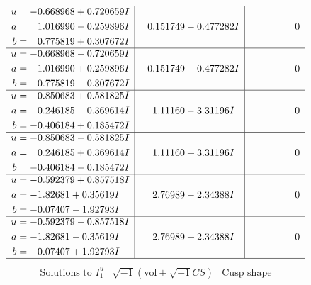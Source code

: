 \documentclass[1p]{elsarticle_modified}
\theoremstyle{definition}
\newcommand{\I}{\sqrt{-1}}
\begin{document}
$$\begin{array}{c|c|c}
\begin{aligned}
u &= -0.668968 + 0.720659 I \\
a &= \phantom{-}1.016990 - 0.259896 I \\
b &= \phantom{-}0.775819 + 0.307672 I\end{aligned}
 & \phantom{-}0.151749 - 0.477282 I & \phantom{-0.000000 } 0 \\ \hline\begin{aligned}
u &= -0.668968 - 0.720659 I \\
a &= \phantom{-}1.016990 + 0.259896 I \\
b &= \phantom{-}0.775819 - 0.307672 I\end{aligned}
 & \phantom{-}0.151749 + 0.477282 I & \phantom{-0.000000 } 0 \\ \hline\begin{aligned}
u &= -0.850683 + 0.581825 I \\
a &= \phantom{-}0.246185 - 0.369614 I \\
b &= -0.406184 + 0.185472 I\end{aligned}
 & \phantom{-}1.11160 - 3.31196 I & \phantom{-0.000000 } 0 \\ \hline\begin{aligned}
u &= -0.850683 - 0.581825 I \\
a &= \phantom{-}0.246185 + 0.369614 I \\
b &= -0.406184 - 0.185472 I\end{aligned}
 & \phantom{-}1.11160 + 3.31196 I & \phantom{-0.000000 } 0 \\ \hline\begin{aligned}
u &= -0.592379 + 0.857518 I \\
a &= -1.82681 + 0.35619 I \\
b &= -0.07407 - 1.92793 I\end{aligned}
 & \phantom{-}2.76989 - 2.34388 I & \phantom{-0.000000 } 0 \\ \hline\begin{aligned}
u &= -0.592379 - 0.857518 I \\
a &= -1.82681 - 0.35619 I \\
b &= -0.07407 + 1.92793 I\end{aligned}
 & \phantom{-}2.76989 + 2.34388 I & \phantom{-0.000000 } 0\\
 \hline 
 \end{array}$$\newpage$$\begin{array}{c|c|c}  
\text{Solutions to }I^u_{1}& \I (\text{vol} + \sqrt{-1}CS) & \text{Cusp shape}\\
 \hline 
\begin{aligned}

\end{aligned}
\end{array}$$
\end{document}
